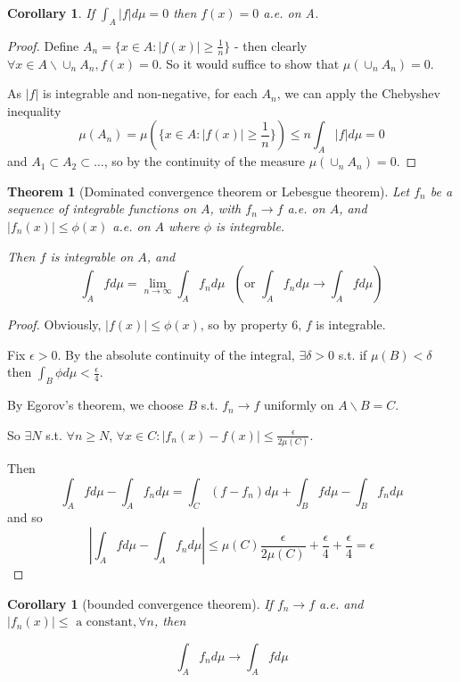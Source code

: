 \documentclass[11pt,a4paper]{report}
\newtheorem{corollary}[theorem]{Corollary}
\theoremstyle{plain}
\newtheorem{thm}{Theorem}[section]
\theoremstyle{definition}
\theoremstyle{remark}
\newcommand{\union}{\cup}
\newcommand{\abs}[1]{\left| #1 \right|}
\begin{document}
\begin{corollary}
    If $\int_A \abs{f} d\mu = 0$ then $f(x) = 0$ a.e. on A.
\end{corollary}

\begin{proof}
    Define $A_n = \{ x \in A : \abs{f(x)} \ge \frac{1}{n} \}$ - then clearly $\forall x \in A \backslash \union_n A_n, f(x) = 0$. So it would suffice to show that $\mu(\union_n A_n) = 0$. 
    
    As $\abs{f}$ is integrable and non-negative, for each $A_n$, we can apply the Chebyshev inequality
    $$ \mu(A_n) = \mu(\{x \in A : \abs{f(x)} \ge \frac{1}{n}\}) \le n \int_A \abs{f}d\mu = 0 $$
    and $A_1 \subset A_2 \subset \dots$, so by the continuity of the measure $\mu(\union_n A_n) = 0$.
\end{proof}

\begin{thm}[Dominated convergence theorem or Lebesgue theorem]
    Let $f_n$ be a sequence of integrable functions on $A$, with $f_n \rightarrow f$ a.e. on $A$, and $\abs{f_n(x)} \le \phi(x)$ a.e. on $A$ where $\phi$ is integrable.

    Then $f$ is integrable on $A$, and 
    $$\int_A f d\mu = \lim_{n \rightarrow \infty} \int_A f_n d\mu \text{ } \left(\text{or $\int_A f_n d\mu \rightarrow \int_A f d\mu$} \right)$$
\end{thm}

\begin{proof}
    Obviously, $\abs{f(x)} \le \phi(x)$, so by property 6, $f$ is integrable.

    Fix $\epsilon > 0$. By the absolute continuity of the integral, $\exists \delta > 0$ s.t. if $\mu(B) < \delta$ then $\int_B \phi d\mu < \frac{\epsilon}{4}$.

    By Egorov's theorem, we choose $B$ s.t. $f_n \rightarrow f$ uniformly on $A \backslash B = C$.

    So $\exists N$ s.t. $\forall n \ge N$, $\forall x \in C: \abs{f_n(x) - f(x)} \le \frac{\epsilon}{2\mu(C)}$.

    Then 
    $$ \int_A f d\mu - \int_A f_n d\mu = \int_C (f - f_n) d\mu + \int_B f d\mu - \int_B f_n d\mu$$
    and so
    $$ \abs{\int_A f d\mu - \int_A f_n d\mu} \le \mu(C)\frac{\epsilon}{2\mu(C)} + \frac{\epsilon}{4} + \frac{\epsilon}{4} = \epsilon $$
\end{proof}


\begin{corollary}[bounded convergence theorem]

    If $f_n \rightarrow f$ a.e. and $\abs{f_n(x)} \le \text{ a constant}, \forall n$, then

    $$ \int_A f_n d\mu \rightarrow \int_A f d\mu $$
\end{corollary}
\end{document}
